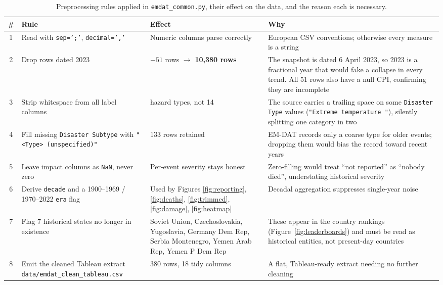 \documentclass[11pt,a4paper]{article}
\begin{document}
\begin{table}[H]
\centering
\caption{Preprocessing rules applied in \texttt{emdat\_common.py}, their effect
on the data, and the reason each is necessary.}
\label{tab:prep}
\small
\begin{tabularx}{\linewidth}{@{}c >{\raggedright\arraybackslash}p{3.5cm}
                               >{\raggedright\arraybackslash}p{3.3cm} X@{}}
\toprule
\textbf{\#} & \textbf{Rule} & \textbf{Effect} & \textbf{Why}\\
\midrule
1 & Read with \texttt{sep=';'}, \texttt{decimal=','} & Numeric columns parse correctly & European CSV conventions; otherwise every measure is a string\\
2 & Drop rows dated 2023 & $-51$ rows $\rightarrow$ \textbf{10{,}380 rows} & The snapshot is dated 6 April 2023, so 2023 is a fractional year that would fake a collapse in every trend. All 51 rows also have a null CPI, confirming they are incomplete\\
3 & Strip whitespace from all label columns & 13 hazard types, not 14 & The source carries a trailing space on some \texttt{Disaster Type} values (\texttt{"Extreme temperature~"}), silently splitting one category in two\\
4 & Fill missing \texttt{Disaster Subtype} with \texttt{"<Type> (unspecified)"} & 2{,}133 rows retained & EM-DAT records only a coarse type for older events; dropping them would bias the record toward recent years\\
5 & Leave impact columns as \texttt{NaN}, never zero & Per-event severity stays honest & Zero-filling would treat ``not reported'' as ``nobody died'', understating historical severity\\
6 & Derive \texttt{decade} and a 1900--1969 / 1970--2022 \texttt{era} flag & Used by Figures \ref{fig:reporting}, \ref{fig:deaths}, \ref{fig:trimmed}, \ref{fig:damage}, \ref{fig:heatmap} & Decadal aggregation suppresses single-year noise\\
7 & Flag 7 historical states no longer in existence & Soviet Union, Czechoslovakia, Yugoslavia, Germany Dem Rep, Serbia Montenegro, Yemen Arab Rep, Yemen P Dem Rep & These appear in the country rankings (Figure~\ref{fig:leaderboards}) and must be read as historical entities, not present-day countries\\
8 & Emit the cleaned Tableau extract
    \texttt{data/}\allowbreak\texttt{emdat\_clean\_}\allowbreak\texttt{tableau.csv} & 10{,}380 rows, 18 tidy columns & A flat, Tableau-ready extract needing no further cleaning\\
\bottomrule
\end{tabularx}
\end{table}
\end{document}
